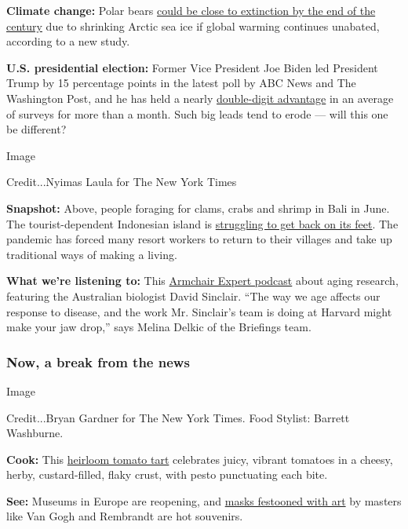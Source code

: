 \textbf{Climate change:} Polar bears
\href{https://www.nytimes.com/2020/07/20/climate/polar-bear-extinction.html}{could
be close to extinction by the end of the century} due to shrinking
Arctic sea ice if global warming continues unabated, according to a new
study.

\textbf{U.S. presidential election:} Former Vice President Joe Biden led
President Trump by 15 percentage points in the latest poll by ABC News
and The Washington Post, and he has held a nearly
\href{https://www.nytimes.com/2020/07/20/upshot/biden-trump-poll.html}{double-digit
advantage} in an average of surveys for more than a month. Such big
leads tend to erode --- will this one be different?

Image

Credit...Nyimas Laula for The New York Times

\textbf{Snapshot:} Above, people foraging for clams, crabs and shrimp in
Bali in June. The tourist-dependent Indonesian island is
\href{https://www.nytimes.com/2020/07/20/world/asia/bali-tourism-coronavirus.html}{struggling
to get back on its feet}. The pandemic has forced many resort workers to
return to their villages and take up traditional ways of making a
living.

\textbf{What we're listening to:} This
\href{https://armchairexpertpod.com/pods/david-sinclair}{Armchair Expert
podcast} about aging research, featuring the Australian biologist David
Sinclair. ``The way we age affects our response to disease, and the work
Mr. Sinclair's team is doing at Harvard might make your jaw drop,'' says
Melina Delkic of the Briefings team.

\hypertarget{now-a-break-from-the-news}{%
\subsubsection{Now, a break from the
news}\label{now-a-break-from-the-news}}

Image

Credit...Bryan Gardner for The New York Times. Food Stylist: Barrett
Washburne.

\textbf{Cook:} This
\href{https://cooking.nytimes.com/recipes/1021252-heirloom-tomato-tart}{heirloom
tomato tart} celebrates juicy, vibrant tomatoes in a cheesy, herby,
custard-filled, flaky crust, with pesto punctuating each bite.

\textbf{See:} Museums in Europe are reopening, and
\href{https://www.nytimes.com/2020/07/16/arts/design/museums-masks.html?action=click\&module=RelatedLinks\&pgtype=collection}{masks
festooned with art} by masters like Van Gogh and Rembrandt are hot
souvenirs.

